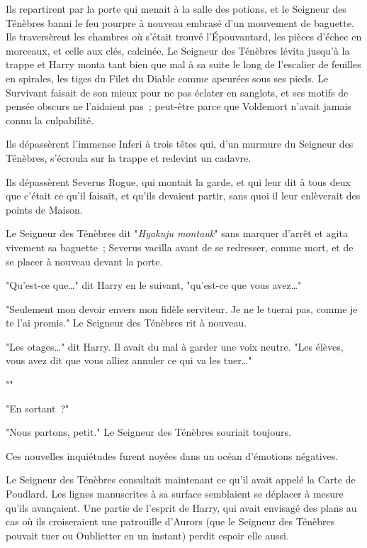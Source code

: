 Ils repartirent par la porte qui menait à la salle des potions, et le Seigneur des Ténèbres banni le feu pourpre à nouveau embrasé d'un mouvement de baguette. Ils traversèrent les chambres où s'était trouvé l'Épouvantard, les pièces d'échec en morceaux, et celle aux clés, calcinée. Le Seigneur des Ténèbres lévita jusqu'à la trappe et Harry monta tant bien que mal à sa suite le long de l'escalier de feuilles en spirales, les tiges du Filet du Diable comme apeurées sous ses pieds. Le Survivant faisait de son mieux pour ne pas éclater en sanglots, et ses motifs de pensée obscurs ne l'aidaient pas~; peut-être parce que Voldemort n'avait jamais connu la culpabilité.

Ils dépassèrent l'immense Inferi à trois têtes qui, d'un murmure du Seigneur des Ténèbres, s'écroula sur la trappe et redevint un cadavre.

Ils dépassèrent Severus Rogue, qui montait la garde, et qui leur dit à tous deux que c'était ce qu'il faisait, et qu'ils devaient partir, sans quoi il leur enlèverait des points de Maison.

Le Seigneur des Ténèbres dit "\emph{Hyakuju montauk}" sans marquer d'arrêt et agita vivement sa baguette~; Severus vacilla avant de se redresser, comme mort, et de se placer à nouveau devant la porte.

"Qu'est-ce que…" dit Harry en le suivant, "qu'est-ce que vous avez…"

"Seulement mon devoir envers mon fidèle serviteur. Je ne le tuerai pas, comme je te l'ai promis." Le Seigneur des Ténèbres rit à nouveau.

"Les otages…" dit Harry. Il avait du mal à garder une voix neutre. "Les élèves, vous avez dit que vous alliez annuler ce qui va les tuer…"

""

"En sortant~?"

"Nous partons, petit." Le Seigneur des Ténèbres souriait toujours.

Ces nouvelles inquiétudes furent noyées dans un océan d'émotions négatives.

Le Seigneur des Ténèbres consultait maintenant ce qu'il avait appelé la Carte de Poudlard. Les lignes manuscrites à sa surface semblaient se déplacer à mesure qu'ils avançaient. Une partie de l'esprit de Harry, qui avait envisagé des plans au cas où ils croiseraient une patrouille d'Aurors (que le Seigneur des Ténèbres pouvait tuer ou Oublietter en un instant) perdit espoir elle aussi.

